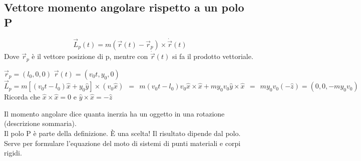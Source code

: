 \subsection{Vettore momento angolare rispetto a un polo P}
$$\vec{L}_p(t) = m(\vec{r}(t) - \vec{r}_p) \times \dot{\vec{r}}(t)$$
Dove $\vec{r}_p$ è il vettore posizione di p, mentre con $\dot{\vec{r}}(t)$ si fa il prodotto vettoriale.
\begin{example}
    $\vec{r}_p = (l_0, 0, 0)$ \hspace{15pt} $\vec{r}(t) = (v_0t, y_0, 0)$\\
    $\vec{L}_p = m[(v_0t - l_0)\hat{x} + y_0\hat{y}] \times (v_0\hat{x}) \:\: = \:\: m(v_0t - l_0)v_0 \hat{x} \times \hat{x} + my_0v_0\hat{y}\times \hat{x} 
    \:\: = \:\: my_0v_0(-\hat{z}) = (0,0, -my_0v_0)$\\
    Ricorda che $\hat{x} \times \hat{x} = 0$ e $\hat{y} \times \hat{x} = -\hat{z}$
\end{example}
\hspace{-15pt}Il momento angolare dice quanta inerzia ha un oggetto in una rotazione (descrizione sommaria).\\
Il polo P è parte della definizione. È una scelta! Il risultato dipende dal polo.
Serve per formulare l'equazione del moto di sistemi di punti materiali e corpi rigidi.

